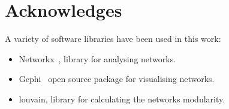 \documentclass{article}
\theoremstyle{definition}
\begin{document}
\section{Acknowledges}

A variety of software libraries have been used in this work:

\begin{itemize}
    \item Networkx~\cite{networkx}, library for analysing networks.
    \item Gephi~\cite{ICWSM09154} open source package for visualising networks.
    \item louvain, library for calculating the networks modularity.
\end{itemize}

\newpage


\end{document}
